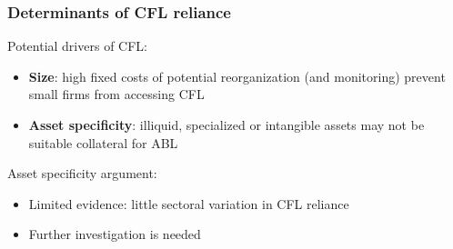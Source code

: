 \documentclass[notes]{beamer}
\begin{document}
\begin{frame}[label=reasons]
\frametitle{Determinants of CFL reliance}
Potential drivers of CFL: 
\begin{itemize}
\item \textbf{Size}: high fixed costs of potential reorganization (and monitoring) prevent small firms from accessing CFL
\item \textbf{Asset specificity}: illiquid, specialized or intangible assets may not be suitable collateral for ABL
\end{itemize} \vspace{5mm}
Asset specificity argument: 
\begin{itemize}
\item Limited evidence: little sectoral variation in CFL reliance 
\item Further investigation is needed 
\end{itemize}
\begin{center}
\hyperlink{Sic CFL}{} \hspace{5mm}
\end{center}

\end{frame}



\end{document}
